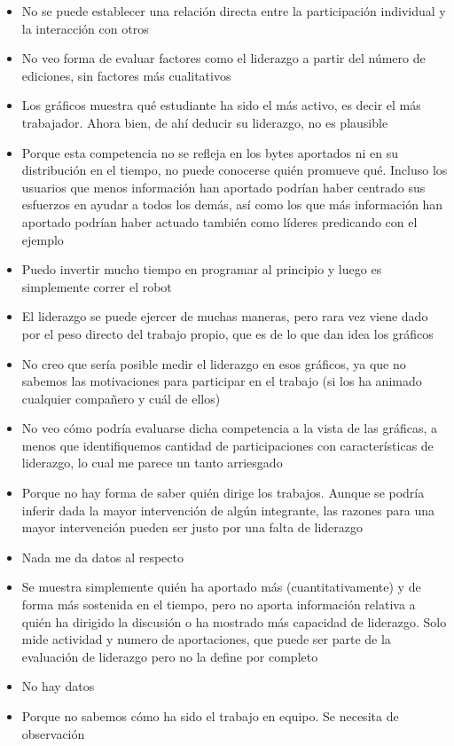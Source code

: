 \begin{itemize}
\item No se puede establecer una relación directa entre la participación individual y la interacción con otros
\item No veo forma de evaluar factores como el liderazgo a partir del número de ediciones, sin factores más cualitativos
\item Los gráficos muestra qué estudiante ha sido el más activo, es decir el más trabajador. Ahora bien, de ahí deducir su liderazgo, no es plausible
\item Porque esta competencia no se refleja en los bytes aportados ni en su distribución en el tiempo, no puede conocerse quién promueve qué. Incluso los usuarios que menos información han aportado podrían haber centrado sus esfuerzos en ayudar a todos los demás, así como los que más información han aportado podrían haber actuado también como líderes predicando con el ejemplo
\item Puedo invertir mucho tiempo en programar al principio y luego es simplemente correr el robot
\item El liderazgo se puede ejercer de muchas maneras, pero rara vez viene dado por el peso directo del trabajo propio, que es de lo que dan idea los gráficos
\item No creo que sería posible medir el liderazgo en esos gráficos, ya que no sabemos las motivaciones para participar en el trabajo (si los ha animado cualquier compañero y cuál de ellos)
\item No veo cómo podría evaluarse dicha competencia a la vista de las gráficas, a menos que identifiquemos cantidad de participaciones con características de liderazgo, lo cual me parece un tanto arriesgado
\item Porque no hay forma de saber quién dirige los trabajos. Aunque se podría inferir dada la mayor intervención de algún integrante, las razones para una mayor intervención pueden ser justo por una falta de liderazgo
\item Nada me da datos al respecto
\item Se muestra simplemente quién ha aportado más (cuantitativamente) y de forma más sostenida en el tiempo, pero no aporta información relativa a quién ha dirigido la discusión o ha mostrado más capacidad de liderazgo. Solo mide actividad y numero de aportaciones, que puede ser parte de la evaluación de liderazgo pero no la define por completo
\item No hay datos
\item Porque no sabemos cómo ha sido el trabajo en equipo. Se necesita de observación

\end{itemize}
